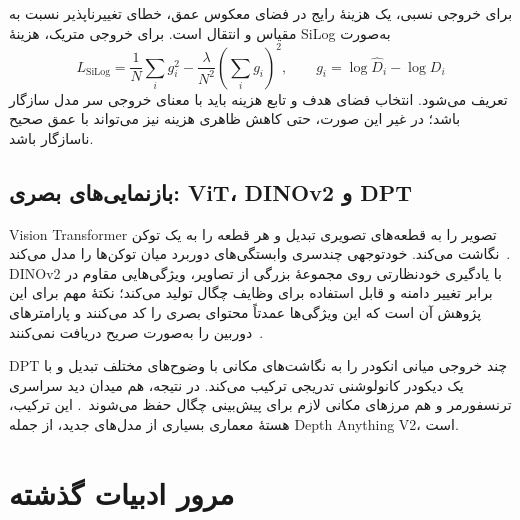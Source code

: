 برای خروجی نسبی، یک هزینهٔ رایج در فضای معکوس عمق، خطای تغییرناپذیر نسبت به مقیاس و انتقال است. برای خروجی متریک، هزینهٔ SiLog به‌صورت
\begin{equation}
 L_{\mathrm{SiLog}}=\frac1N\sum_i g_i^2-\frac{\lambda}{N^2}\left(\sum_i g_i\right)^2,\qquad g_i=\log\hat D_i-\log D_i
\end{equation}
تعریف می‌شود. انتخاب فضای هدف و تابع هزینه باید با معنای خروجی سر مدل سازگار باشد؛ در غیر این صورت، حتی کاهش ظاهری هزینه نیز می‌تواند با عمق صحیح ناسازگار باشد.

\subsection{بازنمایی‌های بصری: ViT، DINOv2 و DPT}
Vision Transformer تصویر را به قطعه‌های تصویری تبدیل و هر قطعه را به یک توکن نگاشت می‌کند. خودتوجهی چندسری وابستگی‌های دوربرد میان توکن‌ها را مدل می‌کند~\cite{Dosovitskiy2020ViT}. DINOv2 با یادگیری خودنظارتی روی مجموعهٔ بزرگی از تصاویر، ویژگی‌هایی مقاوم در برابر تغییر دامنه و قابل استفاده برای وظایف چگال تولید می‌کند؛ نکتهٔ مهم برای این پژوهش آن است که این ویژگی‌ها عمدتاً محتوای بصری را کد می‌کنند و پارامترهای دوربین را به‌صورت صریح دریافت نمی‌کنند~\cite{Oquab2023DINOv2}.

DPT چند خروجی میانی انکودر را به نگاشت‌های مکانی با وضوح‌های مختلف تبدیل و با یک دیکودر کانولوشنی تدریجی ترکیب می‌کند. در نتیجه، هم میدان دید سراسری ترنسفورمر و هم مرزهای مکانی لازم برای پیش‌بینی چگال حفظ می‌شوند~\cite{Ranftl2021DPT}. این ترکیب، هستهٔ معماری بسیاری از مدل‌های جدید، از جمله Depth Anything V2، است.

\section{مرور ادبیات گذشته}
\label{sec:ch2_literature}


